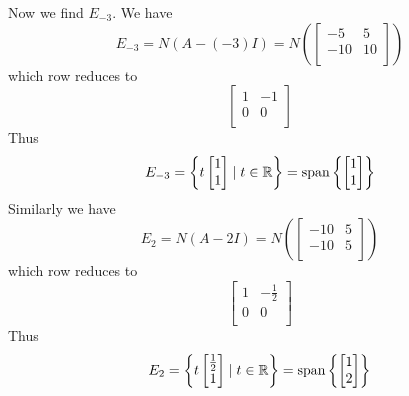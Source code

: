 \documentclass{article}
\DeclareMathOperator{\spn}{span}
\begin{document}
\begin{example}
  Now we find $E_{-3}$. We have \[
    E_{-3} = N(A -(-3)I) = N\left(
    \begin{bmatrix}
        -5  & 5  \\
        -10 & 10 \\
      \end{bmatrix}\right)
  \] which row reduces to \[
    \begin{bmatrix}
      1 & -1 \\
      0 & 0  \\
    \end{bmatrix}
  \] Thus \[
    E_{-3} = \left\{ t
    \begin{bmatrix}
      1 \\1\\
    \end{bmatrix}\mid t \in \R \right\} = \spn \left\{
    \begin{bmatrix}
      1 \\1\\
    \end{bmatrix}\right\}
  \]
  Similarly we have \[
    E_2 = N(A - 2I) = N\left(
    \begin{bmatrix}
        -10 & 5 \\
        -10 & 5 \\
      \end{bmatrix}\right)
  \] which row reduces to \[
    \begin{bmatrix}
      1 & -\frac{1}{2} \\
      0 & 0            \\
    \end{bmatrix}
  \] Thus \[
    E_{2} = \left\{ t
    \begin{bmatrix}
      \frac{1}{2} \\1\\
    \end{bmatrix}\mid t \in \R \right\} = \spn \left\{
    \begin{bmatrix}
      1 \\2\\
    \end{bmatrix}\right\}
  \]
\end{example}
\end{document}
